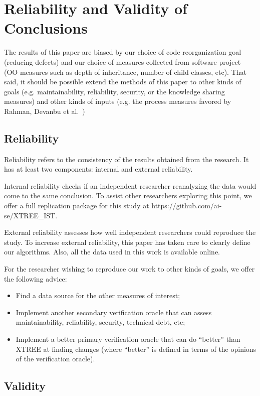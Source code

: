 \documentclass[twocolumn,5p]{elsarticle}
\newcommand{\bi}{\begin{itemize}[leftmargin=0.4cm]}
\newcommand{\ei}{\end{itemize}}
\theoremstyle{break}
\begin{document}
	
	\section{Reliability and Validity of Conclusions}
	\label{sect:valid}
	
	
	
	The results of this paper are biased by our choice of code reorganization
	goal (reducing defects) and our choice of measures collected from software
	project (OO measures such as depth of inheritance, number of child classes,
	etc). That said, it should be possible extend the methods of this paper to 
	other
	kinds of goals (e.g. maintainability, reliability, security, or the 
	knowledge sharing
	measures) and other kinds of
	inputs (e.g. the process measures favored by Rahman,
	Devanbu et al.~\cite{Rahman2013})
	
	\subsection{Reliability}
	Reliability refers to the consistency of the results obtained
	from the research. It has at least two components: internal
	and external reliability.
	
	Internal reliability checks if an independent researcher
	reanalyzing the data would come to the same conclusion.
	To assist other researchers exploring this point, we offer a full 
	replication package for this study at
	https://github.com/ai-se/XTREE\_IST.
	
	External reliability assesses how well independent researchers
	could reproduce the study. To increase external
	reliability, this paper has taken care to clearly define our
	algorithms. Also, all the data used in this work is available
	online.
	
	For the researcher wishing to reproduce our work to other kinds of goals, 
	we offer the following advice:
	
	\bi
	\item Find a data source for the other measures of interest;
	\item Implement another secondary verification oracle that can assess 
	maintainability, reliability, security, technical debt, etc;
	\item Implement a better primary verification oracle that can do ``better'' 
	than XTREE at finding changes (where ``better'' is defined in terms
	of the opinions of the verification oracle). 
	\ei
	
	
	\subsection{Validity}
	
\end{document}
